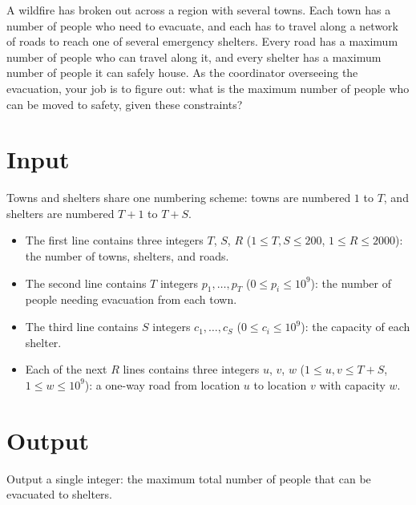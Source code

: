 
A wildfire has broken out across a region with several towns. Each town has a
number of people who need to evacuate, and each has to travel along a network
of roads to reach one of several emergency shelters. Every road has a maximum 
number of people who can travel along it, and every shelter has a maximum number 
of people it can safely house. As the coordinator overseeing the evacuation, your 
job is to figure out: what is the maximum number of people who can be moved to 
safety, given these constraints?

\section*{Input}
Towns and shelters share one numbering scheme: towns are numbered
$1$ to $T$, and shelters are numbered $T{+}1$ to $T{+}S$.

\begin{itemize}
\item The first line contains three integers $T$, $S$, $R$
  ($1 \le T, S \le 200$, $1 \le R \le 2000$): the number of towns,
  shelters, and roads.
\item The second line contains $T$ integers $p_1, \dots, p_T$
  ($0 \le p_i \le 10^9$): the number of people needing evacuation
  from each town.
\item The third line contains $S$ integers $c_1, \dots, c_S$
  ($0 \le c_i \le 10^9$): the capacity of each shelter.
\item Each of the next $R$ lines contains three integers $u$, $v$, $w$
  ($1 \le u, v \le T+S$, $1 \le w \le 10^9$): a one-way road from
  location $u$ to location $v$ with capacity $w$.
\end{itemize}

\section*{Output}
Output a single integer: the maximum total number of people that can be
evacuated to shelters.